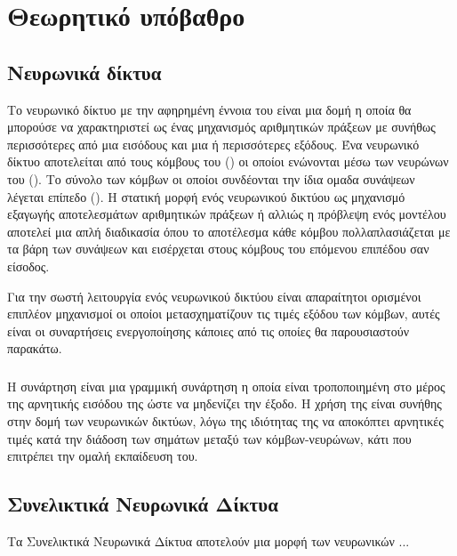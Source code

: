 \chapter{Θεωρητικό υπόβαθρο}
\label{ch:theoreteical_background}

\section{Νευρωνικά δίκτυα}
Το νευρωνικό δίκτυο με την αφηρημένη έννοια του είναι μια δομή η οποία θα μπορούσε να χαρακτηριστεί ως ένας μηχανισμός αριθμητικών πράξεων με συνήθως περισσότερες από μια εισόδους και μια ή περισσότερες εξόδους. Ένα νευρωνικό δίκτυο αποτελείται από τους κόμβους του () οι οποίοι ενώνονται μέσω των νευρώνων του (). Το σύνολο των κόμβων οι οποίοι συνδέονται την ίδια ομαδα συνάψεων λέγεται επίπεδο (). Η στατική μορφή ενός νευρωνικού δικτύου ως μηχανισμό εξαγωγής αποτελεσμάτων αριθμητικών πράξεων ή αλλιώς η πρόβλεψη ενός μοντέλου αποτελεί μια απλή διαδικασία όπου το αποτέλεσμα κάθε κόμβου πολλαπλασιάζεται με τα βάρη των συνάψεων  και εισέρχεται στους κόμβους του επόμενου επιπέδου σαν είσοδος.

Για την σωστή λειτουργία ενός νευρωνικού δικτύου είναι απαραίτητοι ορισμένοι επιπλέον μηχανισμοί οι οποίοι μετασχηματίζουν τις τιμές εξόδου των κόμβων, αυτές είναι οι συναρτήσεις ενεργοποίησης κάποιες από τις οποίες θα παρουσιαστούν παρακάτω.

\subsection{}
Η συνάρτηση  είναι μια γραμμική συνάρτηση η οποία είναι τροποποιημένη στο μέρος της αρνητικής εισόδου της ώστε να μηδενίζει την έξοδο. Η χρήση της είναι συνήθης στην δομή των νευρωνικών δικτύων, λόγω της ιδιότητας της να αποκόπτει αρνητικές τιμές κατά την διάδοση των σημάτων μεταξύ των κόμβων-νευρώνων, κάτι που επιτρέπει την ομαλή εκπαίδευση του.

\subsection{}

\section{Συνελικτικά Νευρωνικά Δίκτυα}
Τα Συνελικτικά Νευρωνικά Δίκτυα αποτελούν μια μορφή των νευρωνικών ...

